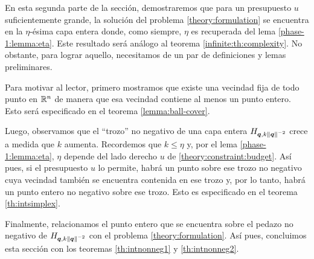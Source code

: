 En esta segunda parte de la sección, demostraremos que para un presupuesto $u$ suficientemente
grande, la solución del problema \eqref{theory:formulation} se encuentra en la $\eta$-ésima capa
entera donde, como siempre, $\eta$ es recuperada del lema \ref{phase-1:lemma:eta}. Este resultado
será análogo al teorema \ref{infinite:th:complexity}. No obstante, para lograr aquello, necesitamos
de un par de definiciones y lemas preliminares.

Para motivar al lector, primero mostramos que existe una vecindad fija de todo punto en $\mathbb{R}^n$ de
manera que esa vecindad contiene al menos un punto entero. Esto será especificado en el teorema
\ref{lemma:ball-cover}.

Luego, observamos que el ``trozo'' no negativo de una capa entera $H_{\boldsymbol{q},
k\left\lVert \boldsymbol{q} \right\rVert^{-2}}$ crece a medida que $k$ aumenta. Recordemos que $k \leq
\eta$ y, por el lema \ref{phase-1:lemma:eta}, $\eta$ depende del lado derecho
$u$ de \eqref{theory:constraint:budget}. Así pues, si el presupuesto $u$ lo
permite, habrá un punto sobre ese trozo no negativo cuya vecindad también se
encuentra contenida en ese trozo y, por lo tanto, habrá un punto entero no
negativo sobre ese trozo. Esto es especificado en el teorema
\ref{th:intsimplex}.

Finalmente, relacionamos el punto entero que se encuentra sobre el pedazo no negativo de
$H_{\boldsymbol{q}, k\left\lVert \boldsymbol{q} \right\rVert^{-2}}$ con el problema \eqref{theory:formulation}. Así pues, concluimos
esta sección con los teoremas \ref{th:intnonneg1} y \ref{th:intnonneg2}.

